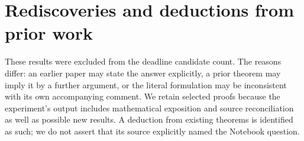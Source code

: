 \section{Rediscoveries and deductions from prior work}
\label{app:prior}

These results were excluded from the deadline candidate count.
The reasons differ: an earlier paper may state the answer explicitly,
a prior theorem may imply it by a further argument, or the literal
formulation may be inconsistent with its own accompanying comment.
We retain selected proofs because the experiment's output includes
mathematical exposition and source reconciliation as well as possible
new results. A deduction from existing theorems is identified as such;
we do not assert that its source explicitly named the Notebook question.




